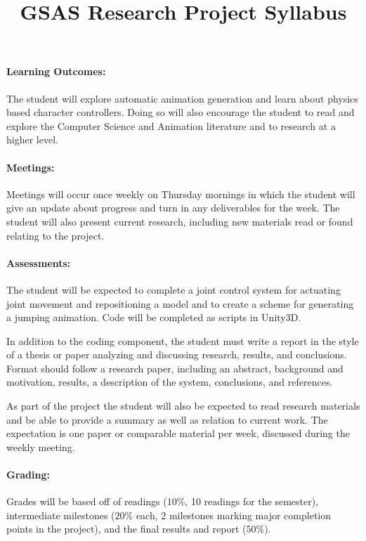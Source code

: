 \documentclass[12pt, letter]{article}
\title{GSAS Research Project Syllabus}
\date{}
\begin{document}
	\maketitle
	\paragraph{Learning Outcomes:} The student will explore automatic animation generation and learn about physics based character controllers.  Doing so will also encourage the student to read and explore the Computer Science and Animation literature and to research at a higher level.
	
	\paragraph{Meetings:} Meetings will occur once weekly on Thursday mornings in which the student will give an update about progress and turn in any deliverables for the week.  The student will also present current research, including new materials read or found relating to the project.
	
	\paragraph{Assessments:} The student will be expected to complete a joint control system for actuating joint movement and repositioning a model and to create a scheme for generating a jumping animation.  Code will be completed as scripts in Unity3D.
	
	In addition to the coding component, the student must write a report in the style of a thesis or paper analyzing and discussing research, results, and conclusions.  Format should follow a research paper, including an abstract, background and motivation, results, a description of the system, conclusions, and references.
	
	As part of the project the student will also be expected to read research materials and be able to provide a summary as well as relation to current work.  The expectation is one paper or comparable material per week, discussed during the weekly meeting.
	
	\paragraph{Grading:} Grades will be based off of readings ($10\%$, 10 readings for the semester), intermediate milestones ($20\%$ each, 2 milestones marking major completion points in the project), and the final results and report ($50\%$).
\end{document}
